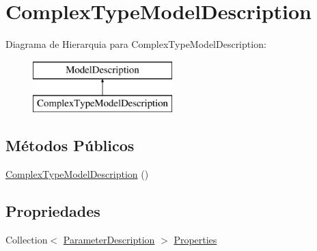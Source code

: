 \hypertarget{classApi3Layers_1_1Areas_1_1HelpPage_1_1ModelDescriptions_1_1ComplexTypeModelDescription}{}\section{Complex\+Type\+Model\+Description}
\label{classApi3Layers_1_1Areas_1_1HelpPage_1_1ModelDescriptions_1_1ComplexTypeModelDescription}
Diagrama de Hierarquia para Complex\+Type\+Model\+Description\+:\begin{figure}[H]
\begin{center}
\leavevmode
\includegraphics[height=2.000000cm]{classApi3Layers_1_1Areas_1_1HelpPage_1_1ModelDescriptions_1_1ComplexTypeModelDescription}
\end{center}
\end{figure}
\subsection*{Métodos Públicos}
\begin{DoxyCompactItemize}
\item 
\hyperlink{classApi3Layers_1_1Areas_1_1HelpPage_1_1ModelDescriptions_1_1ComplexTypeModelDescription_a81a0cc465616fd3a2f00f1295fafcb78}{Complex\+Type\+Model\+Description} ()
\end{DoxyCompactItemize}
\subsection*{Propriedades}
\begin{DoxyCompactItemize}
\item 
Collection$<$ \hyperlink{classApi3Layers_1_1Areas_1_1HelpPage_1_1ModelDescriptions_1_1ParameterDescription}{Parameter\+Description} $>$ \hyperlink{classApi3Layers_1_1Areas_1_1HelpPage_1_1ModelDescriptions_1_1ComplexTypeModelDescription_adc2966acc96bfe491b21fec063855b8c}{Properties}
\end{DoxyCompactItemize}


